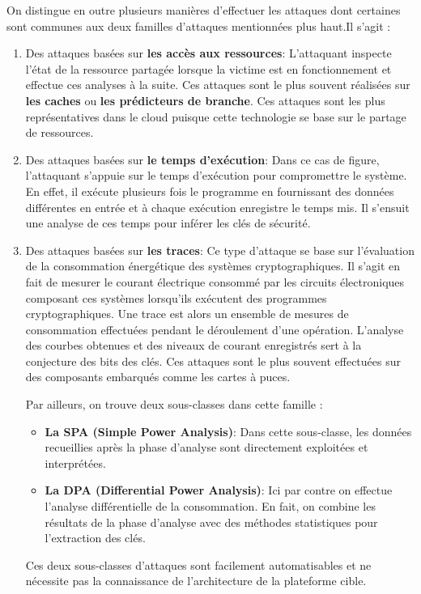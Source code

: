On distingue en outre plusieurs manières d’effectuer les attaques dont certaines sont communes aux deux familles d’attaques mentionnées plus haut.Il s’agit :
\begin{enumerate}
 \item  Des attaques basées sur \textbf{les accès aux ressources}: L’attaquant inspecte  l’état de la ressource partagée lorsque la victime est en fonctionnement et effectue ces analyses à la suite. Ces attaques sont le plus souvent réalisées sur  \textbf{les caches} ou \textbf{les prédicteurs de branche}. Ces attaques sont les plus représentatives dans le cloud puisque cette technologie se base sur le partage de ressources. 
 \item Des attaques basées sur \textbf{ le temps d’exécution}: Dans ce cas de figure, l’attaquant s’appuie sur le temps d’exécution pour compromettre le système. En effet, il exécute plusieurs fois le programme en  fournissant des données différentes en entrée  et à chaque exécution enregistre le temps mis. Il s’ensuit une analyse de ces temps pour inférer les clés de sécurité.
 \item Des attaques basées sur \textbf{ les traces}: Ce type d’attaque se base sur l’évaluation de  la consommation énergétique des systèmes cryptographiques. Il s’agit en fait de mesurer le courant électrique consommé par les circuits électroniques composant ces systèmes lorsqu’ils exécutent des programmes cryptographiques.  Une trace est alors un ensemble de mesures de consommation effectuées pendant le déroulement d’une opération. L’analyse des courbes obtenues et des niveaux de courant enregistrés sert à la conjecture des bits  des clés. Ces attaques sont le plus souvent effectuées sur des composants embarqués comme les cartes à puces. \par Par ailleurs, on trouve deux  sous-classes dans cette famille \cite{Kocher}:
  \begin{itemize}
   \item  \textbf{La SPA (Simple Power Analysis)}: Dans cette sous-classe, les données  recueillies après la phase d’analyse sont directement  exploitées et interprétées.
   \item  \textbf{La DPA (Differential Power Analysis)}: Ici par contre on effectue l’analyse différentielle de la consommation. En fait, on combine les résultats de la phase d’analyse avec  des méthodes statistiques pour l’extraction des clés.
  \end{itemize}
Ces deux sous-classes d’attaques sont facilement automatisables et ne nécessite pas la connaissance de l’architecture de la plateforme cible.
\end{enumerate}\newline


